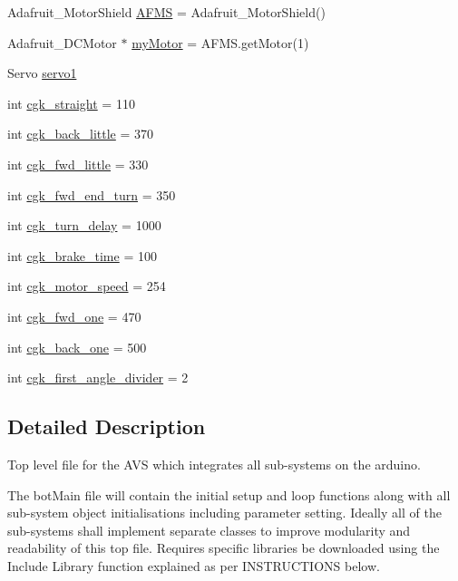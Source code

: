 \begin{DoxyCompactItemize}
Adafruit\+\_\+\+Motor\+Shield \mbox{\hyperlink{bot_main_8ino_a7e8151031cf9a913ec4a28a5f56ed7c0}{A\+F\+MS}} = Adafruit\+\_\+\+Motor\+Shield()
\item 
Adafruit\+\_\+\+D\+C\+Motor $\ast$ \mbox{\hyperlink{bot_main_8ino_a7c7e284865b6a4f560b4b312c14b9401}{my\+Motor}} = A\+F\+M\+S.\+get\+Motor(1)
\item 
Servo \mbox{\hyperlink{bot_main_8ino_ac5d2bea44c6318454db0e2639a4efe95}{servo1}}
\item 
int \mbox{\hyperlink{bot_main_8ino_a5bb179d9202804dccaa9f18aa453df29}{cgk\+\_\+straight}} = 110
\item 
int \mbox{\hyperlink{bot_main_8ino_a561c3c1ac229de5ea299ea71e1b1a797}{cgk\+\_\+back\+\_\+little}} = 370
\item 
int \mbox{\hyperlink{bot_main_8ino_a5319965a94b5c8e64061d2999f513ec6}{cgk\+\_\+fwd\+\_\+little}} = 330
\item 
int \mbox{\hyperlink{bot_main_8ino_a24a75c74d8b88fb34b3753881d8a18de}{cgk\+\_\+fwd\+\_\+end\+\_\+turn}} = 350
\item 
int \mbox{\hyperlink{bot_main_8ino_a3e81c768ee699008e7e551d8ebb140f2}{cgk\+\_\+turn\+\_\+delay}} = 1000
\item 
int \mbox{\hyperlink{bot_main_8ino_a7ec3cca0a6256b97b26506e7c3d2f793}{cgk\+\_\+brake\+\_\+time}} = 100
\item 
int \mbox{\hyperlink{bot_main_8ino_a73b8bce90bbda89fe2c9cace8ebd7467}{cgk\+\_\+motor\+\_\+speed}} = 254
\item 
int \mbox{\hyperlink{bot_main_8ino_a49bdb35c116d5940c7ee0698d8508043}{cgk\+\_\+fwd\+\_\+one}} = 470
\item 
int \mbox{\hyperlink{bot_main_8ino_a91243a6041a1ec2fce66d4c8cfd2a139}{cgk\+\_\+back\+\_\+one}} = 500
\item 
int \mbox{\hyperlink{bot_main_8ino_acb1471feb53affb97626965870071b54}{cgk\+\_\+first\+\_\+angle\+\_\+divider}} = 2
\end{DoxyCompactItemize}


\subsection{Detailed Description}
Top level file for the A\+VS which integrates all sub-\/systems on the arduino. 

The bot\+Main file will contain the initial setup and loop functions along with all sub-\/system object initialisations including parameter setting. Ideally all of the sub-\/systems shall implement separate classes to improve modularity and readability of this top file. Requires specific libraries be downloaded using the Include Library function explained as per I\+N\+S\+T\+R\+U\+C\+T\+I\+O\+NS below. 

